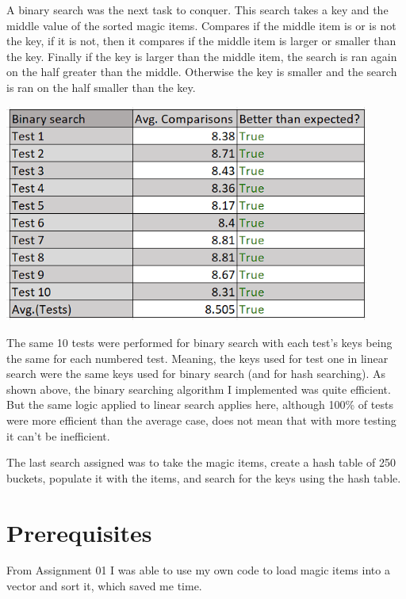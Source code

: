 \documentclass[12pt, letterpaper]{article}
\begin{document}
A binary search was the next task to conquer.
This search takes a key and the middle value of the sorted magic items.
Compares if the middle item is or is not the key, if it is not, then it compares if the middle item is larger or smaller than the key.
Finally if the key is larger than the middle item, the search is ran again on the half greater than the middle.
Otherwise the key is smaller and the search is ran on the half smaller than the key.
\begin{center}
   \includegraphics[width=120mm,scale=0.5]{BinSearch.png}
\end{center}
The same 10 tests were performed for binary search with each test's keys being the same for each numbered test.
Meaning, the keys used for test one in linear search were the same keys used for binary search (and for hash searching).
As shown above, the binary searching algorithm I implemented was quite efficient.
But the same logic applied to linear search applies here, although 100\% of tests were more efficient than the average case, does not mean that with more testing it can't be inefficient.

The last search assigned was to take the magic items, create a hash table of 250 buckets, populate it with the items, and search for the keys using the hash table.



\section{Prerequisites} \label{Prereq}


From Assignment 01 I was able to use my own code to load magic items into a vector and sort it, which saved me time. 
\end{document}
